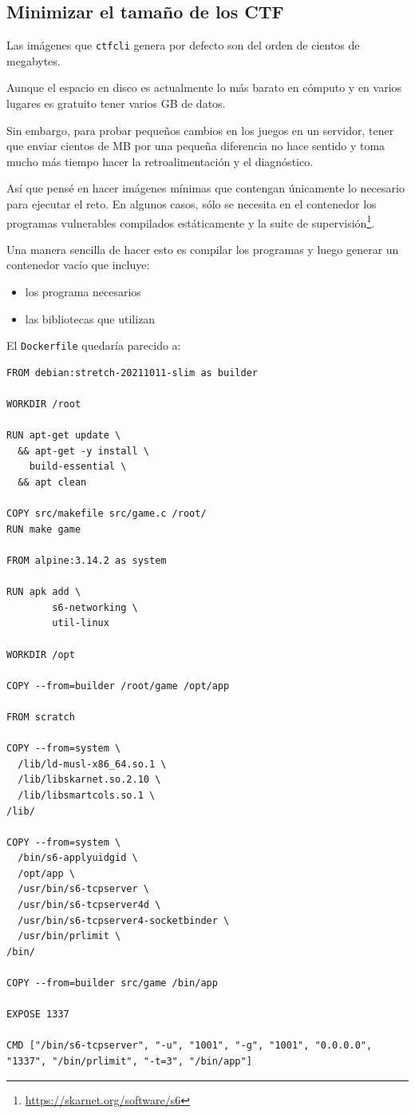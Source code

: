 \documentclass[
  12,
]{scrartcl}
\DeclareRobustCommand{\href}[2]{#2\footnote{\url{#1}}}
\providecommand{\tightlist}{%
  \setlength{\itemsep}{0pt}\setlength{\parskip}{0pt}}
\begin{document}
\hypertarget{minimizar-el-tamauxf1o-de-los-ctf}{%
\subsection{Minimizar el tamaño de los
CTF}\label{minimizar-el-tamauxf1o-de-los-ctf}}

Las imágenes que \texttt{ctfcli} genera por defecto son del orden de
cientos de megabytes.

Aunque el espacio en disco es actualmente lo más barato en cómputo y en
varios lugares es gratuito tener varios GB de datos.

Sin embargo, para probar pequeños cambios en los juegos en un servidor,
tener que enviar cientos de MB por una pequeña diferencia no hace
sentido y toma mucho más tiempo hacer la retroalimentación y el
diagnóstico.

Así que pensé en hacer imágenes mínimas que contengan únicamente lo
necesario para ejecutar el reto. En algunos casos, sólo se necesita en
el contenedor los programas vulnerables compilados estáticamente y
\href{https://skarnet.org/software/s6}{la suite de supervisión}.

Una manera sencilla de hacer esto es compilar los programas y luego
generar un contenedor vacío que incluye:

\begin{itemize}
\tightlist
\item
  los programa necesarios
\item
  las bibliotecas que utilizan
\end{itemize}

El \texttt{Dockerfile} quedaría parecido a:

\begin{verbatim}
FROM debian:stretch-20211011-slim as builder

WORKDIR /root

RUN apt-get update \
  && apt-get -y install \
    build-essential \
  && apt clean

COPY src/makefile src/game.c /root/
RUN make game

FROM alpine:3.14.2 as system

RUN apk add \
        s6-networking \
        util-linux

WORKDIR /opt

COPY --from=builder /root/game /opt/app

FROM scratch

COPY --from=system \
  /lib/ld-musl-x86_64.so.1 \
  /lib/libskarnet.so.2.10 \
  /lib/libsmartcols.so.1 \
/lib/

COPY --from=system \
  /bin/s6-applyuidgid \
  /opt/app \
  /usr/bin/s6-tcpserver \
  /usr/bin/s6-tcpserver4d \
  /usr/bin/s6-tcpserver4-socketbinder \
  /usr/bin/prlimit \
/bin/

COPY --from=builder src/game /bin/app

EXPOSE 1337

CMD ["/bin/s6-tcpserver", "-u", "1001", "-g", "1001", "0.0.0.0", "1337", "/bin/prlimit", "-t=3", "/bin/app"]
\end{verbatim}
\end{document}
